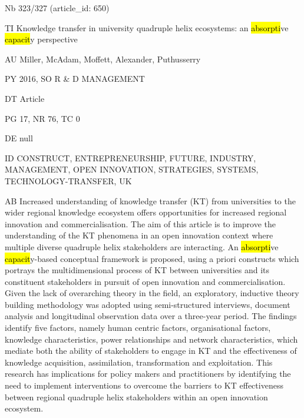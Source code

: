 \documentclass[a4paper]{article}
\begin{document}
\vspace*{-2cm}
Nb \tabto{0cm}323/327 (article\_id: 650)\par
TI \tabto{0cm}Knowledge transfer in university quadruple helix ecosystems: an \hl{absorpti}ve \hl{capacit}y perspective\par
AU \tabto{0cm}Miller, McAdam, Moffett, Alexander, Puthusserry\par
PY \tabto{0cm}2016, SO R \& D MANAGEMENT\par
DT \tabto{0cm}Article\par
PG \tabto{0cm}17, NR 76, TC 0\par
DE \tabto{0cm}null\par
ID \tabto{0cm}CONSTRUCT, ENTREPRENEURSHIP, FUTURE, INDUSTRY, MANAGEMENT, OPEN INNOVATION, STRATEGIES, SYSTEMS, TECHNOLOGY-TRANSFER, UK\par
AB \tabto{0cm}Increased understanding of knowledge transfer (KT) from universities to the wider regional knowledge ecosystem offers opportunities for increased regional innovation and commercialisation. The aim of this article is to improve the understanding of the KT phenomena in an open innovation context where multiple diverse quadruple helix stakeholders are interacting. An \hl{absorpti}ve \hl{capacit}y-based conceptual framework is proposed, using a priori constructs which portrays the multidimensional process of KT between universities and its constituent stakeholders in pursuit of open innovation and commercialisation. Given the lack of overarching theory in the field, an exploratory, inductive theory building methodology was adopted using semi-structured interviews, document analysis and longitudinal observation data over a three-year period. The findings identify five factors, namely human centric factors, organisational factors, knowledge characteristics, power relationships and network characteristics, which mediate both the ability of stakeholders to engage in KT and the effectiveness of knowledge acquisition, assimilation, transformation and exploitation. This research has implications for policy makers and practitioners by identifying the need to implement interventions to overcome the barriers to KT effectiveness between regional quadruple helix stakeholders within an open innovation ecosystem.\par
\clearpage
\end{document}
